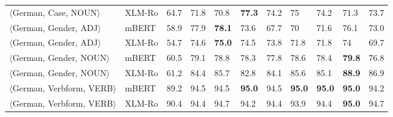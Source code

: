 \begin{tabular}{llllllllllr}
      $\langle$German, Case, NOUN$\rangle$ &         XLM-Ro &           64.7 &          71.8 &           70.8 &   \textbf{77.3} &         74.2 &           75 &         74.2 &          71.3 &           73.7 \\
     $\langle$German, Gender, ADJ$\rangle$ &          mBERT &           58.9 &          77.9 &     \textbf{78.1} &         73.6 &         67.7 &           70 &         71.6 &          76.1 &           73.0 \\
     $\langle$German, Gender, ADJ$\rangle$ &         XLM-Ro &           54.7 &          74.6 &     \textbf{75.0} &         74.5 &         73.8 &         71.8 &         71.8 &            74 &           69.7 \\
    $\langle$German, Gender, NOUN$\rangle$ &          mBERT &           60.5 &          79.1 &           78.8 &         78.3 &         77.8 &         78.6 &         78.4 &    \textbf{79.8} &           76.8 \\
    $\langle$German, Gender, NOUN$\rangle$ &         XLM-Ro &           61.2 &          84.4 &           85.7 &         82.8 &         84.1 &         85.6 &         85.1 &    \textbf{88.9} &           86.9 \\
  $\langle$German, Verbform, VERB$\rangle$ &          mBERT &           89.2 &          94.5 &           94.5 &   \textbf{95.0} &         94.5 &   \textbf{95.0} &   \textbf{95.0} &    \textbf{95.0} &           94.2 \\
  $\langle$German, Verbform, VERB$\rangle$ &         XLM-Ro &           90.4 &          94.4 &           94.7 &         94.2 &         94.4 &         93.9 &         94.4 &    \textbf{95.0} &           94.7 \\
\bottomrule
\end{tabular}
